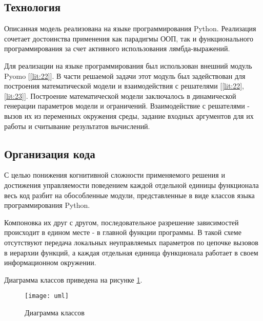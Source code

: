 
\subsection*{Технология}
Описанная модель реализована на языке программирования Python. Реализация сочетает достоинства применения как парадигмы ООП, так и функционального программирования за счет активного использования лямбда-выражений.

Для реализации на языке программирования был использован внешний модуль Pyomo [\ref{lit:22}]. В части решаемой задачи этот модуль был задействован для построения математической модели и взаимодействия с решателями [\ref{lit:22}, \ref{lit:23}]. Построение математической модели заключалось в динамической генерации параметров модели и ограничений. Взаимодействие с решателями - вызов их из переменных окружения среды, задание входных аргументов для их работы и считывание результатов вычислений.

\subsection*{Организация кода}
С целью понижения когнитивной сложности применяемого решения и достижения управляемости поведением каждой отдельной единицы функционала весь код разбит на обособленные модули, представленные в виде классов языка программирования Python.

Компоновка их друг с другом, последовательное разрешение зависимостей происходит в едином месте - в главной функции программы. В такой схеме отсутствуют передача локальных неуправляемых параметров по цепочке вызовов в иерархии функций, а каждая отдельная единица функционала работает в своем информационном окружении.

Диаграмма классов приведена на рисунке \ref{fig:uml}.

\begin{figure}[H]
    \centering
    \texttt{[image: uml]}
    \caption{Диаграмма классов}
    \label{fig:uml}
\end{figure}
